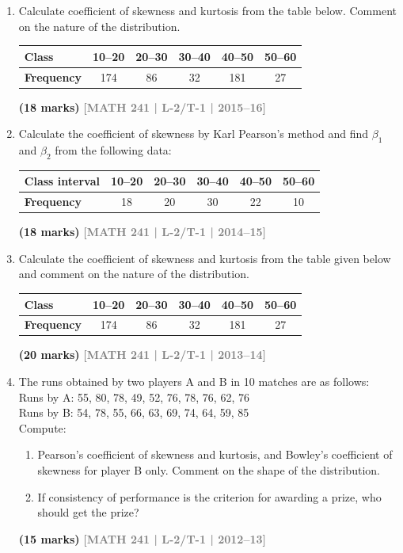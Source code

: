\documentclass[12pt,a4paper]{article}
\newcommand{\yr}[1]{\hfill\textcolor{gray}{\small\textbf{[#1]}}}
\newcommand{\mk}[1]{\textcolor{orange!70!black}{\small\textbf{(#1 marks)}}}
\begin{document}
\begin{enumerate}
\item Calculate coefficient of skewness and kurtosis from the table below. Comment on the nature of the distribution.
\begin{center}
\begin{tabular}{lccccc}
\toprule
\textbf{Class} & 10--20 & 20--30 & 30--40 & 40--50 & 50--60 \\
\midrule
\textbf{Frequency} & 174 & 86 & 32 & 181 & 27 \\
\bottomrule
\end{tabular}
\end{center}
\mk{18} \yr{MATH 241 | L-2/T-1 | 2015--16}

\item Calculate the coefficient of skewness by Karl Pearson's method and find $\beta_{1}$ and $\beta_{2}$ from the following data:
\begin{center}
\begin{tabular}{lccccc}
\toprule
\textbf{Class interval} & 10--20 & 20--30 & 30--40 & 40--50 & 50--60 \\
\midrule
\textbf{Frequency} & 18 & 20 & 30 & 22 & 10 \\
\bottomrule
\end{tabular}
\end{center}
\mk{18} \yr{MATH 241 | L-2/T-1 | 2014--15}

\item Calculate the coefficient of skewness and kurtosis from the table given below and comment on the nature of the distribution.
\begin{center}
\begin{tabular}{lccccc}
\toprule
\textbf{Class} & 10--20 & 20--30 & 30--40 & 40--50 & 50--60 \\
\midrule
\textbf{Frequency} & 174 & 86 & 32 & 181 & 27 \\
\bottomrule
\end{tabular}
\end{center}
\mk{20} \yr{MATH 241 | L-2/T-1 | 2013--14}

\item The runs obtained by two players A and B in 10 matches are as follows:\\[4pt]
Runs by A: 55, 80, 78, 49, 52, 76, 78, 76, 62, 76\\
Runs by B: 54, 78, 55, 66, 63, 69, 74, 64, 59, 85\\[4pt]
Compute:
\begin{enumerate}
  \item Pearson's coefficient of skewness and kurtosis, and Bowley's coefficient of skewness for player B only. Comment on the shape of the distribution.
  \item If consistency of performance is the criterion for awarding a prize, who should get the prize?
\end{enumerate}
\mk{15} \yr{MATH 241 | L-2/T-1 | 2012--13}


\end{enumerate}
\end{document}
